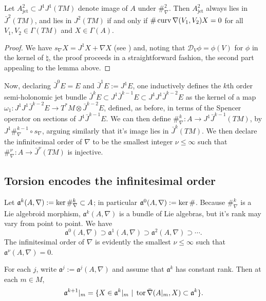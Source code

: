 \documentclass[leqno,12pt]{amsart} %
\begin{document}
\begin{proposition}
  Let $A_\mathrm{jet}^2 \subset J^1 J^1 (TM)$ denote image of $A$ under $\#_\nabla^2$. Then
  $A_\mathrm{jet}^2$ always lies in $\bar J^2(TM)$, and lies in $J^2(TM)$ if and only if
  $\#\operatorname{curv} \nabla (V_1, V_2)X =0$ for all $V_1, V_2 \in \Gamma(TM)$ and
  $X \in \Gamma(A)$.
\end{proposition}
\begin{proof}
  We have $s_\nabla X = J^1 X + \nabla X$ (see ) and, noting that
  ${\mathcal D}_V\phi = \phi(V) $ for $\phi$ in the kernel of $\natural$, the proof
  proceeds in a straightforward fashion, the second part appealing to the lemma above.
\end{proof}

Now, declaring $\bar J^0 E = E$ and $\bar J^1 E := J^1 E$, one inductively defines the
$k$th order semi-holonomic jet bundle
$\bar J^k E \subset J^1 \bar J^{k-1} E \subset J^1 J^1 \bar J^{k-2} E$ as the kernel of a
map $\omega_1 \colon J^1 J^1 \bar J^{k-2} E \rightarrow T^*\!M \otimes \bar J^{k-2}E$,
defined, as before, in terms of the Spencer operator on sections of $J^1 \bar J^{k-1} E$.
We can then define $\#_\nabla^k \colon A \rightarrow J^1 \bar J^{k-1}(TM)$, by
$J^1 \#_\nabla^{k-1} \circ s_\nabla$, arguing similarly that it's image lies in
$\bar J^k(TM)$. We then declare the {\df infinitesimal order} of $\nabla$ to be the
smallest integer $\nu \le \infty$ such that
$\#_\nabla^\nu \colon A \rightarrow \bar J^\nu(TM)$ is injective.

\subsection{Torsion encodes the  infinitesimal order}\label{torsion_encodes}
Let ${\mathfrak a}^k(A, \nabla) := \operatorname{ker}\#_\nabla^k \subset A$; in particular
${\mathfrak a}^0(A, \nabla):=\operatorname{ker}\#$.  Because $\#_\nabla^k$ is a Lie algebroid
morphism, ${\mathfrak a}^k(A, \nabla)$ is a bundle of Lie algebras, but it's rank may vary
from point to point. We have
\begin{equation*}
  {\mathfrak a}^0(A, \nabla) \supset {\mathfrak a}^1(A, \nabla) \supset {\mathfrak a}^2(A,
\nabla) \supset \cdots.
\end{equation*}
The infinitesimal order of $\nabla$ is evidently the smallest $\nu\le \infty$ such that
${\mathfrak a}^\nu(A, \nabla)=0$.
\begin{proposition}
  For each $j$, write ${\mathfrak a}^j:={\mathfrak a}^j(A, \nabla)$ and assume that
  ${\mathfrak a}^k$ has constant rank. Then at each $m \in M$,
  $${\mathfrak a}^{k+1}|_m= \{X \in {\mathfrak a}^k|_m\,\left\vert\right.\, \operatorname{tor} \bar\nabla
  (A|_m, X) \subset {\mathfrak a}^k\}.$$
\end{proposition}
\end{document}
